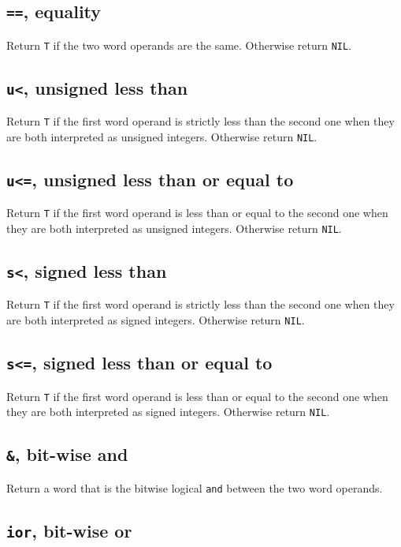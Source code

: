 \subsection{\texttt{==}, equality}

Return \texttt{T} if the two word operands are the same.  Otherwise
return \texttt{NIL}.

\subsection{\texttt{u<}, unsigned less than}

Return \texttt{T} if the first word operand is strictly less than the
second one when they are both interpreted as unsigned integers.
Otherwise return \texttt{NIL}.

\subsection{\texttt{u<=}, unsigned less than or equal to}

Return \texttt{T} if the first word operand is less than or equal to
the second one when they are both interpreted as unsigned integers.
Otherwise return \texttt{NIL}.

\subsection{\texttt{s<}, signed less than}

Return \texttt{T} if the first word operand is strictly less than the
second one when they are both interpreted as signed integers.
Otherwise return \texttt{NIL}.

\subsection{\texttt{s<=}, signed less than or equal to}

Return \texttt{T} if the first word operand is less than or equal to
the second one when they are both interpreted as signed integers.
Otherwise return \texttt{NIL}.

\subsection{\texttt{\&}, bit-wise and}

Return a word that is the bitwise logical \texttt{and} between the two
word operands. 

\subsection{\texttt{ior}, bit-wise or}

